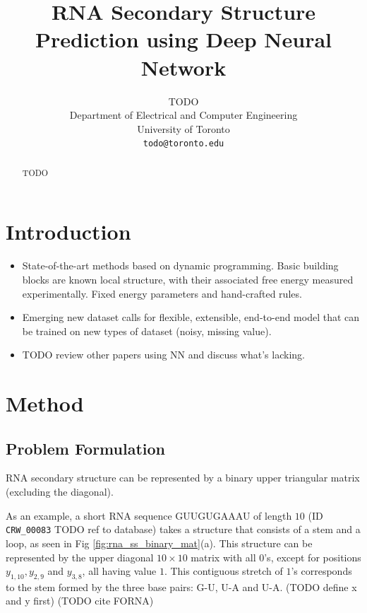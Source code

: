 \documentclass{article}
\title{RNA Secondary Structure Prediction using Deep Neural Network}
\author{%
  TODO \\
  Department of Electrical and Computer Engineering\\
  University of Toronto\\
  \texttt{todo@toronto.edu} \\
}
\begin{document}
\maketitle

\begin{abstract}
  TODO
\end{abstract}


\section{Introduction}

\begin{itemize}

    \item State-of-the-art methods based on dynamic programming.
Basic building blocks are known local structure, with their associated free energy measured experimentally.
Fixed energy parameters and hand-crafted rules.

    \item Emerging new dataset calls for flexible, extensible,
    end-to-end model that can be trained on new types of dataset (noisy, missing value).

    \item TODO review other papers using NN and discuss what's lacking.

\end{itemize}


\section{Method}

\subsection{Problem Formulation}

RNA secondary structure can be represented by a binary upper triangular matrix (excluding the diagonal).

As an example, a short RNA sequence GUUGUGAAAU of length $10$ (ID \verb|CRW_00083| TODO ref to database) takes a structure that
consists of a stem and a loop, as seen in Fig \ref{fig:rna_ss_binary_mat}(a).
This structure can be represented by the upper diagonal $10 \times 10$ matrix with all $0$'s,
except for positions $y_{1, 10}, y_{2, 9}$ and $y_{3, 8}$, all having value $1$.
This contiguous stretch of $1$'s corresponds to the stem formed by the three base pairs: G-U, U-A and U-A.
(TODO define x and y first)
(TODO cite FORNA)
\end{document}
